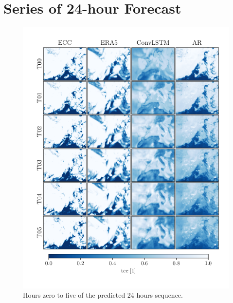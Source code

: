 \chapter{Series of 24-hour Forecast} \label{app:pred_sequence}
\begin{figure}[ht]
    \centering
    \includegraphics{python_figs/comparing_seq_part_1_of4_jan2.png}
    \caption{Hours zero to five of the predicted 24 hours sequence.}
    \label{fig:part1/4}
\end{figure}
